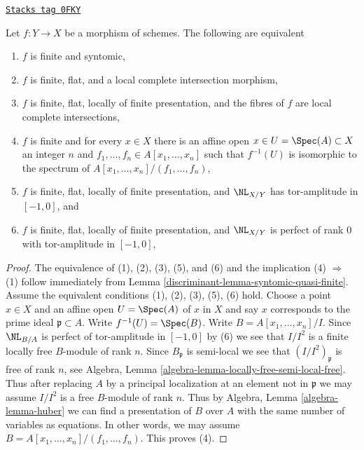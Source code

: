 \begin{lemma}
\label{discriminant-lemma-syntomic-finite}
\href{https://stacks.math.columbia.edu/tag/0FKY}{\texttt{Stacks tag 0FKY}}

Let $f : Y \to X$ be a morphism of schemes. The following are equivalent
\begin{enumerate}
\item $f$ is finite and syntomic,
\item $f$ is finite, flat, and a local complete intersection morphism,
\item $f$ is finite, flat, locally of finite presentation,
and the fibres of $f$ are local complete intersections,
\item $f$ is finite and for every $x \in X$ there is an
affine open $x \in U = \Spec(A) \subset X$ an integer $n$
and $f_1, \ldots, f_n \in A[x_1, \ldots, x_n]$ such that
$f^{-1}(U)$ is isomorphic to the spectrum of
$A[x_1, \ldots, x_n]/(f_1, \ldots, f_n)$,
\item $f$ is finite, flat, locally of finite presentation,
and $\NL_{X/Y}$ has tor-amplitude in $[-1, 0]$, and
\item $f$ is finite, flat, locally of finite presentation, and
$\NL_{X/Y}$ is perfect of rank $0$ with tor-amplitude in $[-1, 0]$,
\end{enumerate}
\end{lemma}

\begin{proof}

The equivalence of (1), (2), (3), (5), and (6)
and the implication (4) $\Rightarrow$ (1) follow immediately
from Lemma \ref{discriminant-lemma-syntomic-quasi-finite}. Assume the equivalent conditions
(1), (2), (3), (5), (6) hold.
Choose a point $x \in X$ and an affine open $U = \Spec(A)$
of $x$ in $X$ and say $x$ corresponds to the prime ideal
$\mathfrak p \subset A$. Write $f^{-1}(U) = \Spec(B)$.
Write $B = A[x_1, \ldots, x_n]/I$. Since $\NL_{B/A}$
is perfect of tor-amplitude in $[-1, 0]$ by (6)
we see that $I/I^2$ is a finite locally free $B$-module
of rank $n$. Since $B_\mathfrak p$ is semi-local we see that
$(I/I^2)_\mathfrak p$ is free of rank $n$, see
Algebra, Lemma \ref{algebra-lemma-locally-free-semi-local-free}.
Thus after replacing $A$ by a principal localization at
an element not in $\mathfrak p$ we may assume $I/I^2$
is a free $B$-module of rank $n$.
Thus by Algebra, Lemma \ref{algebra-lemma-huber}
we can find a presentation of $B$ over $A$
with the same number of variables as equations. In other words,
we may assume $B = A[x_1, \ldots, x_n]/(f_1, \ldots, f_n)$.
This proves (4).
\end{proof}

